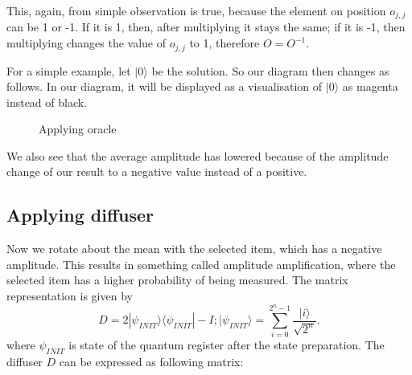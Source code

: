 This, again, from simple observation is true, because the element on position $o_{j,j}$ can be 1 or -1. If it is 1, then, after multiplying it stays the same; if it is -1, then multiplying changes the value of $o_{j,j}$ to 1, therefore $O = O^{-1}$.

For a simple example, let $|0\rangle$ be the solution. So our diagram then changes as follows. In our diagram, it will be displayed as a visualisation of $|0\rangle$ as magenta instead of black.

\begin{center}
\begin{figure}[h]
\caption{Applying oracle} 
\end{figure}
\end{center}


We also see that the average amplitude has lowered because of the amplitude change of our result to a negative value instead of a positive. 
\newpage
\subsection{Applying diffuser} \label{TeoreticalDiffuser}
Now we rotate about the mean with the selected item, which has a negative amplitude. This results in something called amplitude amplification, where the selected item has a higher probability of being measured. The matrix representation is given by \begin{equation}
    D = 2 |\psi_{INIT} \rangle\langle \psi_{INIT} | - I;     |\psi_{INIT}\rangle = \sum_{i=0}^{2^n-1} \frac{|i\rangle }{\sqrt{2^n}}.
\end{equation}where $\psi_{INIT}$ is state of the quantum register after the state preparation. The diffuser $D$ can be expressed as following matrix:

